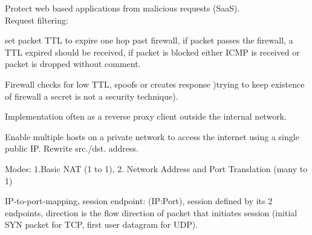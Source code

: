  Protect web based applications from malicious requests (SaaS).
\\ Request filtering:


 set packet TTL to expire one hop past firewall, if packet passes the firewall, a TTL expired should be received, if packet is blocked either ICMP is received or packet is dropped without comment.

 Firewall checks for low TTL, spoofs or creates response )trying to keep existence of firewall a secret is not a security technique).

Implementation often as a reverse proxy client outside the internal network.

 Enable multiple hosts on a private network to access the internet using a single public IP. Rewrite src./dst. address. 

Modes: 1.Basic NAT (1 to 1), 2. Network Address and Port Translation (many to 1)

 IP-to-port-mapping, session endpoint: (IP:Port), session defined by its 2 endpoints, direction is the flow direction of packet that initiates session (initial SYN packet for TCP, first user datagram for UDP).

